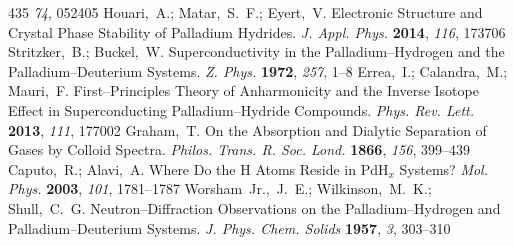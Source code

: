 \documentclass[12pt,letterpaper,oneside]{article}
\begin{document}
\begin{mcitethebibliography}{435}
  \emph{74}, 052405\relax
\mciteBstWouldAddEndPuncttrue
\mciteSetBstMidEndSepPunct{\mcitedefaultmidpunct}
{\mcitedefaultendpunct}{\mcitedefaultseppunct}\relax
\EndOfBibitem
{}
Houari,~A.; Matar,~S.~F.; Eyert,~V. Electronic Structure and Crystal Phase
  Stability of Palladium Hydrides. \emph{J. Appl. Phys.} \textbf{2014},
  \emph{116}, 173706\relax
\mciteBstWouldAddEndPuncttrue
\mciteSetBstMidEndSepPunct{\mcitedefaultmidpunct}
{\mcitedefaultendpunct}{\mcitedefaultseppunct}\relax
\EndOfBibitem
{}
Stritzker,~B.; Buckel,~W. Superconductivity in the Palladium--Hydrogen and the
  Palladium--Deuterium Systems. \emph{Z. Phys.} \textbf{1972}, \emph{257},
  1--8\relax
\mciteBstWouldAddEndPuncttrue
\mciteSetBstMidEndSepPunct{\mcitedefaultmidpunct}
{\mcitedefaultendpunct}{\mcitedefaultseppunct}\relax
\EndOfBibitem
{}
Errea,~I.; Calandra,~M.; Mauri,~F. First--Principles Theory of Anharmonicity
  and the Inverse Isotope Effect in Superconducting Palladium--Hydride
  Compounds. \emph{Phys. Rev. Lett.} \textbf{2013}, \emph{111}, 177002\relax
\mciteBstWouldAddEndPuncttrue
\mciteSetBstMidEndSepPunct{\mcitedefaultmidpunct}
{\mcitedefaultendpunct}{\mcitedefaultseppunct}\relax
\EndOfBibitem
{}
Graham,~T. On the Absorption and Dialytic Separation of Gases by Colloid
  Spectra. \emph{Philos. Trans. R. Soc. Lond.} \textbf{1866}, \emph{156},
  399--439\relax
\mciteBstWouldAddEndPuncttrue
\mciteSetBstMidEndSepPunct{\mcitedefaultmidpunct}
{\mcitedefaultendpunct}{\mcitedefaultseppunct}\relax
\EndOfBibitem
{}
Caputo,~R.; Alavi,~A. Where Do the H Atoms Reside in PdH$_x$ Systems?
  \emph{Mol. Phys.} \textbf{2003}, \emph{101}, 1781--1787\relax
\mciteBstWouldAddEndPuncttrue
\mciteSetBstMidEndSepPunct{\mcitedefaultmidpunct}
{\mcitedefaultendpunct}{\mcitedefaultseppunct}\relax
\EndOfBibitem
{}
Worsham~Jr.,~J.~E.; Wilkinson,~M.~K.; Shull,~C.~G. Neutron--Diffraction
  Observations on the Palladium--Hydrogen and Palladium--Deuterium Systems.
  \emph{J. Phys. Chem. Solids} \textbf{1957}, \emph{3}, 303--310\relax
\mciteBstWouldAddEndPuncttrue
\mciteSetBstMidEndSepPunct{\mcitedefaultmidpunct}
{\mcitedefaultendpunct}{\mcitedefaultseppunct}\relax
\EndOfBibitem
{}

\end{mcitethebibliography}
\end{document}

